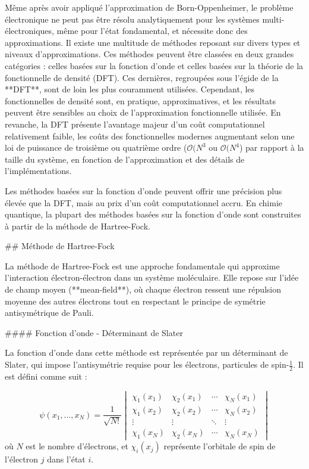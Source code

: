 \documentclass[12pt,a4paper]{report}
\begin{document}
\begin{markdown}
Même après avoir appliqué l'approximation de Born-Oppenheimer, le problème électronique ne peut pas être résolu analytiquement pour les systèmes multi-électroniques, même pour l'état fondamental, et nécessite donc des approximations. Il existe une multitude de méthodes reposant sur divers types et niveaux d'approximations. Ces méthodes peuvent être classées en deux grandes catégories : celles basées sur la fonction d'onde et celles basées sur la théorie de la fonctionnelle de densité (DFT). Ces dernières, regroupées sous l'égide de la **DFT**, sont de loin les plus couramment utilisées. Cependant, les fonctionnelles de densité sont, en pratique, approximatives, et les résultats peuvent être sensibles au choix de l'approximation fonctionnelle utilisée. En revanche, la DFT présente l'avantage majeur d'un coût computationnel relativement faible, les coûts des fonctionnelles modernes augmentant selon une loi de puissance de troisième ou quatrième ordre ($\mathcal{O}(N^3$ ou $\mathcal{O}(N^4$) par rapport à la taille du système, en fonction de l'approximation et des détails de l'implémentations.

Les méthodes basées sur la fonction d'onde peuvent offrir une précision plus élevée que la DFT, mais au prix d'un coût computationnel accru. En chimie quantique, la plupart des méthodes basées sur la fonction d'onde sont construites à partir de la méthode de Hartree-Fock.

## Méthode de Hartree-Fock

La méthode de Hartree-Fock est une approche fondamentale qui approxime l’interaction électron-électron dans un système moléculaire. Elle repose sur l'idée de champ moyen (**mean-field**), où chaque électron ressent une répulsion moyenne des autres électrons tout en respectant le principe de symétrie antisymétrique de Pauli.

#### Fonction d'onde - Déterminant de Slater

La fonction d'onde dans cette méthode est représentée par un déterminant de Slater, qui impose l'antisymétrie requise pour les électrons, particules de spin-\(\frac{1}{2}\). Il est défini comme suit :

\[
\psi(x_1, \ldots, x_N) = \frac{1}{\sqrt{N!}}
\begin{vmatrix}
\chi_1(x_1) & \chi_2(x_1) & \cdots & \chi_N(x_1) \\
\chi_1(x_2) & \chi_2(x_2) & \cdots & \chi_N(x_2) \\
\vdots & \vdots & \ddots & \vdots \\
\chi_1(x_N) & \chi_2(x_N) & \cdots & \chi_N(x_N)
\end{vmatrix}
\]
où \(N\) est le nombre d'électrons, et \(\chi_i(x_j)\) représente l'orbitale de spin de l'électron \(j\) dans l'état \(i\).


\end{markdown}
\end{document}
